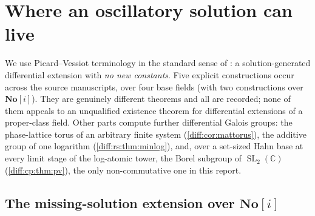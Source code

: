 \documentclass[11pt,letterpaper]{article}
\numberwithin{equation}{section}
\theoremstyle{definition}
\theoremstyle{remark}
\newcommand{\SC}{\mathbf{No}[i]}
\newcommand{\C}{\mathbb C}
\newcommand{\SL}{\operatorname{SL}}
\begin{document}
\section{Where an oscillatory solution can live}
\label{diff:sec:PV}

We use Picard--Vessiot terminology in the standard sense of
\cite{PS,Singer}: a solution-generated differential extension with \emph{no
new constants}. Five explicit constructions occur across the source
manuscripts, over four base fields (with two constructions over $\SC$).
They are genuinely different theorems and all are recorded; none of them
appeals to an unqualified existence theorem for differential extensions of a
proper-class field. Other parts compute further differential Galois groups:
the phase-lattice torus of an arbitrary finite system
(\cref{diff:cor:mattorus}), the additive group of one logarithm
(\cref{diff:rs:thm:minlog}), and, over a set-sized Hahn base at every limit
stage of the log-atomic tower, the Borel subgroup of $\SL_{2}(\C)$
(\cref{diff:cp:thm:pv}), the only non-commutative one in this report.

\subsection{The missing-solution extension over \texorpdfstring{$\SC$}{No[i]}}
\label{diff:sub:PVone}
\end{document}

